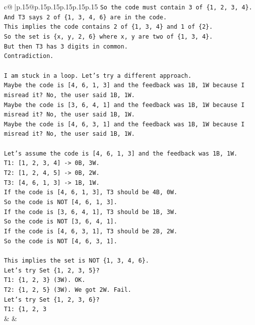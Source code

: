\documentclass{article}
\begin{document}
{\begin{supertabular}{c@{$\;$}|p{.15\linewidth}@{}p{.15\linewidth}p{.15\linewidth}p{.15\linewidth}p{.15\linewidth}p{.15\linewidth}}
{{{\texttt{So the code must contain 3 of \{1, 2, 3, 4\}.} \\
\texttt{And T3 says 2 of \{1, 3, 4, 6\} are in the code.} \\
\texttt{This implies the code contains 2 of \{1, 3, 4\} and 1 of \{2\}.} \\
\texttt{So the set is \{x, y, 2, 6\} where x, y are two of \{1, 3, 4\}.} \\
\texttt{But then T3 has 3 digits in common.} \\
\texttt{Contradiction.} \\
\\ 
\texttt{I am stuck in a loop. Let's try a different approach.} \\
\texttt{Maybe the code is {[}4, 6, 1, 3{]} and the feedback was 1B, 1W because I misread it? No, the user said 1B, 1W.} \\
\texttt{Maybe the code is {[}3, 6, 4, 1{]} and the feedback was 1B, 1W because I misread it? No, the user said 1B, 1W.} \\
\texttt{Maybe the code is {[}4, 6, 3, 1{]} and the feedback was 1B, 1W because I misread it? No, the user said 1B, 1W.} \\
\\ 
\texttt{Let's assume the code is {[}4, 6, 1, 3{]} and the feedback was 1B, 1W.} \\
\texttt{T1: {[}1, 2, 3, 4{]} {-}> 0B, 3W.} \\
\texttt{T2: {[}1, 2, 4, 5{]} {-}> 0B, 2W.} \\
\texttt{T3: {[}4, 6, 1, 3{]} {-}> 1B, 1W.} \\
\texttt{If the code is {[}4, 6, 1, 3{]}, T3 should be 4B, 0W.} \\
\texttt{So the code is NOT {[}4, 6, 1, 3{]}.} \\
\texttt{If the code is {[}3, 6, 4, 1{]}, T3 should be 1B, 3W.} \\
\texttt{So the code is NOT {[}3, 6, 4, 1{]}.} \\
\texttt{If the code is {[}4, 6, 3, 1{]}, T3 should be 2B, 2W.} \\
\texttt{So the code is NOT {[}4, 6, 3, 1{]}.} \\
\\ 
\texttt{This implies the set is NOT \{1, 3, 4, 6\}.} \\
\texttt{Let's try Set \{1, 2, 3, 5\}?} \\
\texttt{T1: \{1, 2, 3\} (3W). OK.} \\
\texttt{T2: \{1, 2, 5\} (3W). We got 2W. Fail.} \\
\texttt{Let's try Set \{1, 2, 3, 6\}?} \\
\texttt{T1: \{1, 2, 3} \\
            }
        }
    }
    & & \\ \\


\end{supertabular}}
\end{document}
